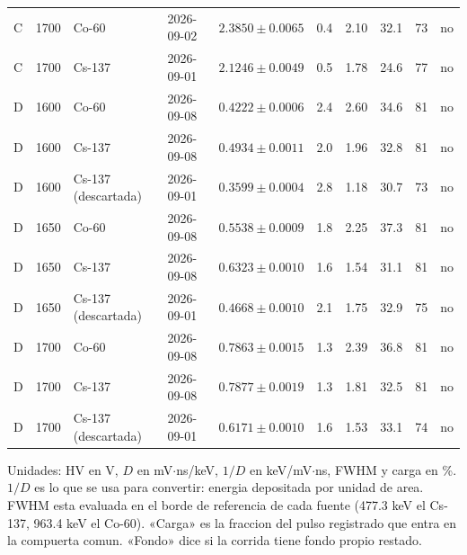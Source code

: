 \begin{longtable}{llllrrrrrc}
C & 1700 & Co-60 & 2026-09-02 & $2.3850 \pm 0.0065$ & 0.4 & 2.10 & 32.1 & 73 & no \\
C & 1700 & Cs-137 & 2026-09-01 & $2.1246 \pm 0.0049$ & 0.5 & 1.78 & 24.6 & 77 & no \\
\midrule
D & 1600 & Co-60 & 2026-09-08 & $0.4222 \pm 0.0006$ & 2.4 & 2.60 & 34.6 & 81 & no \\
D & 1600 & Cs-137 & 2026-09-08 & $0.4934 \pm 0.0011$ & 2.0 & 1.96 & 32.8 & 81 & no \\
D & 1600 & Cs-137 (descartada) & 2026-09-01 & $0.3599 \pm 0.0004$ & 2.8 & 1.18 & 30.7 & 73 & no \\
D & 1650 & Co-60 & 2026-09-08 & $0.5538 \pm 0.0009$ & 1.8 & 2.25 & 37.3 & 81 & no \\
D & 1650 & Cs-137 & 2026-09-08 & $0.6323 \pm 0.0010$ & 1.6 & 1.54 & 31.1 & 81 & no \\
D & 1650 & Cs-137 (descartada) & 2026-09-01 & $0.4668 \pm 0.0010$ & 2.1 & 1.75 & 32.9 & 75 & no \\
D & 1700 & Co-60 & 2026-09-08 & $0.7863 \pm 0.0015$ & 1.3 & 2.39 & 36.8 & 81 & no \\
D & 1700 & Cs-137 & 2026-09-08 & $0.7877 \pm 0.0019$ & 1.3 & 1.81 & 32.5 & 81 & no \\
D & 1700 & Cs-137 (descartada) & 2026-09-01 & $0.6171 \pm 0.0010$ & 1.6 & 1.53 & 33.1 & 74 & no \\
\bottomrule
\end{longtable}
\par\smallskip
\begin{minipage}{0.95\linewidth}\footnotesize Unidades: HV en V, $D$ en mV$\cdot$ns/keV, $1/D$ en keV/mV$\cdot$ns, FWHM y carga en \%. $1/D$ es lo que se usa para convertir: energia depositada por unidad de area. FWHM esta evaluada en el borde de referencia de cada fuente (477.3 keV el Cs-137, 963.4 keV el Co-60). «Carga» es la fraccion del pulso registrado que entra en la compuerta comun. «Fondo» dice si la corrida tiene fondo propio restado.\end{minipage}
